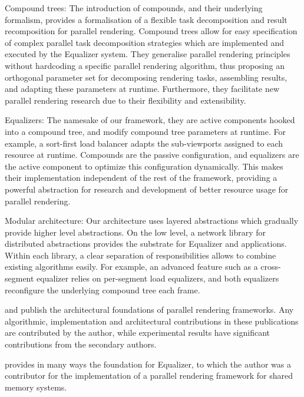 \begin{compactdesc}
\item[Compound trees:] The introduction of compounds, and their underlying
formalism, provides a formalisation of a flexible task decomposition and result
recomposition for parallel rendering. Compound trees allow for easy
specification of complex parallel task decomposition strategies which are
implemented and executed by the Equalizer system. They generalise parallel
rendering principles without hardcoding a specific parallel rendering
algorithm, thus proposing an orthogonal parameter set for decomposing rendering
tasks, assembling results, and adapting these parameters at runtime.
Furthermore, they facilitate new parallel rendering research due to their
flexibility and extensibility.

\item[Equalizers:] The namesake of our framework, they are active components
hooked into a compound tree, and modify compound tree parameters at runtime.
For example, a sort-first load balancer adapts the sub-viewports assigned to
each resource at runtime. Compounds are the passive configuration, and
equalizers are the active component to optimize this configuration dynamically.
This makes their implementation independent of the rest of the framework,
providing a powerful abstraction for research and development of better
resource usage for parallel rendering.

\item[Modular architecture:] Our architecture uses layered abstractions which
gradually provide higher level abstractions. On the low level, a network
library for distributed abstractions provides the substrate for Equalizer and
applications. Within each library, a clear separation of responsibilities
allows to combine existing algorithms easily. For example, an advanced feature
such as a cross-segment equalizer relies on per-segment load equalizers, and
both equalizers reconfigure the underlying compound tree each frame.

\end{compactdesc}

\cite{EMP:09} and \cite{ESP:18} publish the architectural foundations of
parallel rendering frameworks. Any algorithmic, implementation and
architectural contributions in these publications are contributed by the
author, while experimental results have significant contributions from the
secondary authors.

\cite{BRE:05} provides in many ways the foundation for Equalizer, to which the
author was a contributor for the implementation of a parallel rendering
framework for shared memory systems.

